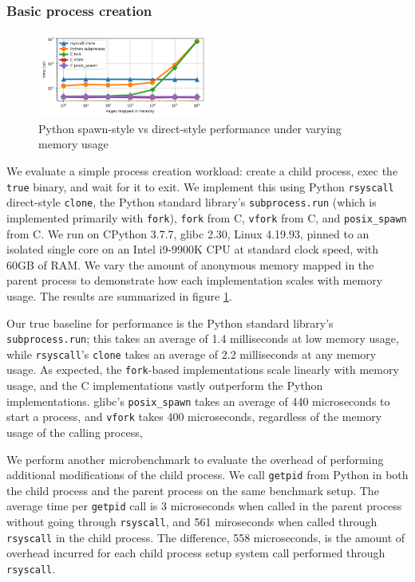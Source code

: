\documentclass[letterpaper,twocolumn,10pt]{article}
\begin{document}
\subsubsection{Basic process creation}
\begin{figure}[h!]
\centering
 \includegraphics[width=0.5\textwidth]{subprocess_bench}
 \caption{Python spawn-style vs direct-style performance under varying memory usage}
 \label{fig:subprocess_bench}
\end{figure}
We evaluate a simple process creation workload:
create a child process, exec the \texttt{true} binary, and wait for it to exit.
We implement this using Python \texttt{rsyscall} direct-style \texttt{clone},
the Python standard library's \texttt{subprocess.run} (which is implemented primarily with \texttt{fork}),
\texttt{fork} from C,
\texttt{vfork} from C,
and \texttt{posix\_spawn} from C.
We run on CPython 3.7.7, glibc 2.30, Linux 4.19.93,
pinned to an isolated single core on an Intel i9-9900K CPU at standard clock speed,
with 60GB of RAM.
We vary the amount of anonymous memory mapped in the parent process
to demonstrate how each implementation scales with memory usage.
The results are summarized in figure \ref{fig:subprocess_bench}.

Our true baseline for performance is the Python standard library's \texttt{subprocess.run};
this takes an average of 1.4 milliseconds at low memory usage,
while \texttt{rsyscall}'s \texttt{clone} takes an average of 2.2 milliseconds at any memory usage.
As expected, the \texttt{fork}-based implementations scale linearly with memory usage,
and the C implementations vastly outperform the Python implementations.
glibc's \texttt{posix\_spawn} takes an average of 440 microseconds to start a process,
and \texttt{vfork} takes 400 microseconds,
regardless of the memory usage of the calling process,

We perform another microbenchmark to evaluate the overhead of performing additional modifications of the child process.
We call \texttt{getpid} from Python
in both the child process and the parent process on the same benchmark setup.
The average time per \texttt{getpid} call is
3 microseconds when called in the parent process without going through \texttt{rsyscall},
and 561 miroseconds when called through \texttt{rsyscall} in the child process.
The difference, 558 microseconds,
is the amount of overhead incurred
for each child process setup system call performed through \texttt{rsyscall}.
\end{document}

